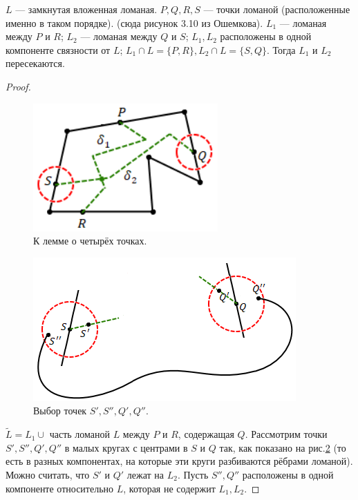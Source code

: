 \begin{lemma}
    $L$ — замкнутая вложенная ломаная. $P, Q, R, S$ — точки ломаной (расположенные именно в таком порядке). (сюда рисунок 3.10 из Ошемкова). $L_1$ — ломаная между $P$ и $R$; $L_2$ — ломаная между $Q$ и $S$; $L_1, L_2$ расположены в одной компоненте связности от $L$; $L_1 \cap L = \{P,R\}, L_2 \cap L = \{S,Q\}$. Тогда $L_1$ и $L_2$ пересекаются.
\end{lemma}
\begin{proof}
    \begin{figure}[htbp]
        \centering
        \includegraphics[scale=1]{images/c5.4.png}
        \caption{К лемме о четырёх точках.}
        \label{fig:c5.4}
    \end{figure}

    \begin{figure}[htbp]
        \centering
        \includegraphics[scale=1]{images/c5.5.png}
        \caption{Выбор точек $S', S'', Q', Q''$.}
        \label{fig:c5.5}
    \end{figure}

    $\tilde{L} = L_1 \cup$ часть ломаной $L$ между $P$ и $R$, содержащая $Q$.
    Рассмотрим точки $S', S'', Q', Q''$ в малых кругах с центрами в $S$ и $Q$ так, как показано на рис.\ref{fig:c5.5} (то есть в разных компонентах, на которые эти круги разбиваются рёбрами ломаной).
    Можно считать, что $S'$ и $Q'$ лежат на $L_2$. Пусть $S'', Q''$ расположены в одной компоненте относительно $L$, которая не содержит $L_1, L_2$.


\end{proof}
